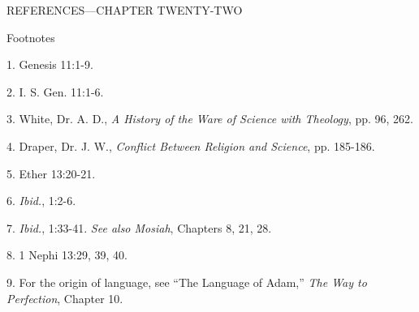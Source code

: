 \newpage
REFERENCES—CHAPTER TWENTY-TWO

Footnotes

1. Genesis 11:1-9.

2. I. S. Gen. 11:1-6.

3. White, Dr. A. D., \textit{A History of the Ware of Science with Theology}, pp. 96, 262.

4. Draper, Dr. J. W., \textit{Conflict Between Religion and Science}, pp. 185-186.

5. Ether 13:20-21.

6. \textit{Ibid.}, 1:2-6.

7. \textit{Ibid.}, 1:33-41. \textit{See also Mosiah}, Chapters 8, 21, 28.

8. 1 Nephi 13:29, 39, 40.

9. For the origin of language, see ``The Language of Adam,'' \textit{The Way to Perfection}, Chapter
10.
